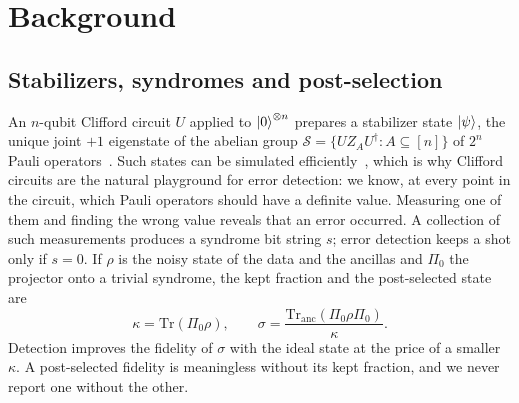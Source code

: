 \section{Background}
\label{sec:background}

\subsection{Stabilizers, syndromes and post-selection}
An $n$-qubit Clifford circuit $U$ applied to $\ket{0}^{\otimes n}$ prepares a stabilizer state $\ket{\psi}$, the unique joint $+1$ eigenstate of the abelian group $\mathcal{S}=\{UZ_AU^\dagger : A\subseteq[n]\}$ of $2^n$ Pauli operators~\cite{gottesman1997stabilizer}. Such states can be simulated efficiently~\cite{aaronson2004improved}, which is why Clifford circuits are the natural playground for error detection: we know, at every point in the circuit, which Pauli operators should have a definite value. Measuring one of them and finding the wrong value reveals that an error occurred. A collection of such measurements produces a syndrome bit string $s$; error detection keeps a shot only if $s=0$. If $\rho$ is the noisy state of the data and the ancillas and $\Pi_0$ the projector onto a trivial syndrome, the kept fraction and the post-selected state are
\begin{equation}
  \kappa=\mathrm{Tr}(\Pi_0\rho),\qquad \sigma=\frac{\mathrm{Tr}_{\mathrm{anc}}(\Pi_0\rho\Pi_0)}{\kappa}.
  \label{eq:postselect}
\end{equation}
Detection improves the fidelity of $\sigma$ with the ideal state at the price of a smaller $\kappa$. A post-selected fidelity is meaningless without its kept fraction, and we never report one without the other.

